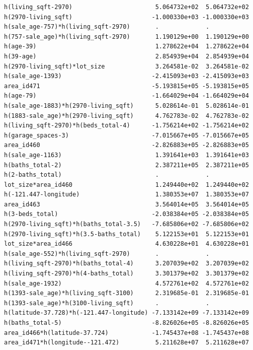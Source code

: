 \documentclass[
]{article}
\begin{document}
\begin{verbatim}
h(living_sqft-2970)                       5.064732e+02  5.064732e+02
h(2970-living_sqft)                      -1.000330e+03 -1.000330e+03
h(sale_age-757)*h(living_sqft-2970)       .             .           
h(757-sale_age)*h(living_sqft-2970)       1.190129e+00  1.190129e+00
h(age-39)                                 1.278622e+04  1.278622e+04
h(39-age)                                 2.854939e+04  2.854939e+04
h(2970-living_sqft)*lot_size              3.264581e-02  3.264581e-02
h(sale_age-1393)                         -2.415093e+03 -2.415093e+03
area_id471                               -5.193815e+05 -5.193815e+05
h(age-79)                                -1.664029e+04 -1.664029e+04
h(sale_age-1883)*h(2970-living_sqft)      5.028614e-01  5.028614e-01
h(1883-sale_age)*h(2970-living_sqft)      4.762783e-02  4.762783e-02
h(living_sqft-2970)*h(beds_total-4)      -1.756214e+02 -1.756214e+02
h(garage_spaces-3)                       -7.015667e+05 -7.015667e+05
area_id460                               -2.826883e+05 -2.826883e+05
h(sale_age-1163)                          1.391641e+03  1.391641e+03
h(baths_total-2)                          2.387211e+05  2.387211e+05
h(2-baths_total)                          .             .           
lot_size*area_id460                       1.249440e+02  1.249440e+02
h(-121.447-longitude)                     1.380353e+07  1.380353e+07
area_id463                                3.564014e+05  3.564014e+05
h(3-beds_total)                          -2.038384e+05 -2.038384e+05
h(2970-living_sqft)*h(baths_total-3.5)   -7.685806e+02 -7.685806e+02
h(2970-living_sqft)*h(3.5-baths_total)    5.122153e+01  5.122153e+01
lot_size*area_id466                       4.630228e+01  4.630228e+01
h(sale_age-552)*h(living_sqft-2970)       .             .           
h(living_sqft-2970)*h(baths_total-4)      3.207039e+02  3.207039e+02
h(living_sqft-2970)*h(4-baths_total)      3.301379e+02  3.301379e+02
h(sale_age-1932)                          4.572761e+02  4.572761e+02
h(1393-sale_age)*h(living_sqft-3100)      2.319685e-01  2.319685e-01
h(1393-sale_age)*h(3100-living_sqft)      .             .           
h(latitude-37.728)*h(-121.447-longitude) -7.133142e+09 -7.133142e+09
h(baths_total-5)                         -8.826026e+05 -8.826026e+05
area_id466*h(latitude-37.724)            -1.745437e+08 -1.745437e+08
area_id471*h(longitude--121.472)          5.211628e+07  5.211628e+07
                                                                    

\end{verbatim}
\end{document}

